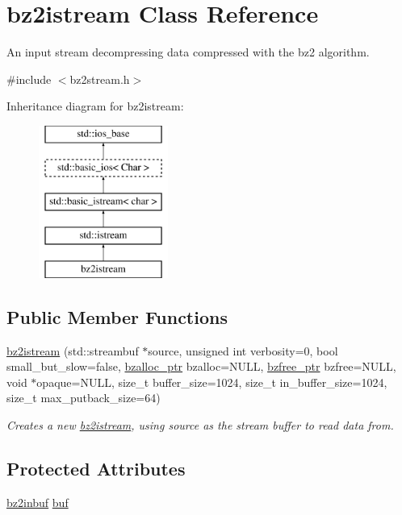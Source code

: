 \hypertarget{classbz2istream}{}\section{bz2istream Class Reference}
\label{classbz2istream}


An input stream decompressing data compressed with the bz2 algorithm.  




{\ttfamily \#include $<$bz2stream.\+h$>$}

Inheritance diagram for bz2istream\+:\begin{figure}[H]
\begin{center}
\leavevmode
\includegraphics[height=5.000000cm]{classbz2istream}
\end{center}
\end{figure}
\subsection*{Public Member Functions}
\begin{DoxyCompactItemize}
\item 
\hyperlink{classbz2istream_a3acc9bb0c5ff34be2ca375ec446f206b}{bz2istream} (std\+::streambuf $\ast$source, unsigned int verbosity=0, bool small\+\_\+but\+\_\+slow=false, \hyperlink{bz2stream_8h_ad84a886ecf0c0c00445cdd219beb6a7b}{bzalloc\+\_\+ptr} bzalloc=N\+U\+L\+L, \hyperlink{bz2stream_8h_a3ae1e0ffde629a32e954abecc8cd7bb2}{bzfree\+\_\+ptr} bzfree=N\+U\+L\+L, void $\ast$opaque=N\+U\+L\+L, size\+\_\+t buffer\+\_\+size=1024, size\+\_\+t in\+\_\+buffer\+\_\+size=1024, size\+\_\+t max\+\_\+putback\+\_\+size=64)
\begin{DoxyCompactList}\small\item\em Creates a new \hyperlink{classbz2istream}{bz2istream}, using source as the stream buffer to read data from. \end{DoxyCompactList}\end{DoxyCompactItemize}
\subsection*{Protected Attributes}
\begin{DoxyCompactItemize}
\item 
\hyperlink{classbz2inbuf}{bz2inbuf} \hyperlink{classbz2istream_aeac9ec32bd8a9e9fc179f0d7db9be81a}{buf}
\end{DoxyCompactItemize}


